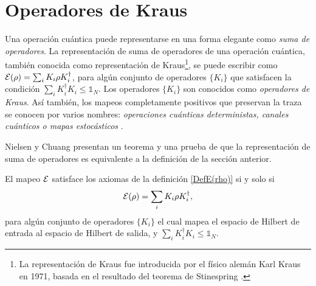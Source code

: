 \section{Operadores de Kraus} %



%

Una operación cuántica puede representarse en una forma elegante 
como  \textit{suma de operadores}.   La representación de suma de operadores de una operación cuántica, también conocida como representación de Kraus\footnote{ La representación de Kraus fue introducida por el físico alemán Karl Kraus en 1971, basada en el resultado del teorema de Stinespring {\cite{2007geometry}}.}, se puede escribir como $\mathcal{E}(\rho)=\sum_i K_i\rho K_i^\dagger$, para algún conjunto de operadores $\{K_i\}$ que satisfacen la condición $\sum_i K_i^\dagger K_i\le \mathds{1}_N$.  Los operadores $\{K_i\}$ son conocidos como \textit{operadores de Kraus}. Así también, los mapeos completamente positivos que preservan la traza se conocen por varios nombres: \textit{operaciones cuánticas deterministas, canales cuánticos o mapas estocásticos}  {\cite{2007geometry}}.

Nielsen y Chuang {\cite{nielsen_chuang_2010}} presentan un teorema y una prueba de que la representación de suma de operadores es equivalente a la definición de la sección anterior.

\begin{theorem}
    El mapeo $\mathcal{E}$ satisface los axiomas de la definición {\ref{DefE(rho)}} si y solo si 
    \begin{equation}
        \mathcal{E}(\rho)=\sum_i K_i \rho K_i^\dagger,
    \end{equation}
    para algún conjunto de operadores $\{K_i\}$ el cual mapea el espacio de Hilbert de entrada al espacio de Hilbert de salida, y $\sum_i K_i^\dagger K_i\le \mathds{1}_N$.
\end{theorem}


